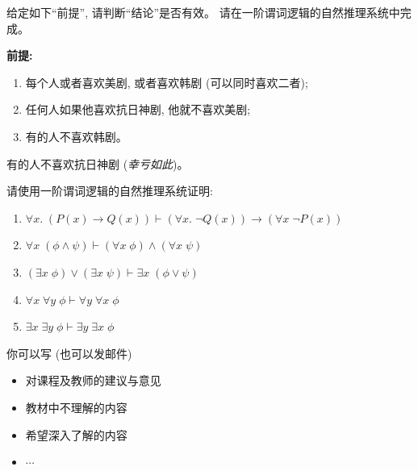 \documentclass[a4paper, justified]{tufte-handout}
\begin{document}
\begin{solution}
\end{solution}

\begin{problem}
  给定如下``前提'', 请判断``结论''是否有效。
  请在一阶谓词逻辑的自然推理系统中完成。

  {\bf 前提:}
  \begin{enumerate}[(1)]
    \item 每个人或者喜欢美剧, 或者喜欢韩剧 (可以同时喜欢二者);
    \item 任何人如果他喜欢抗日神剧, 他就不喜欢美剧;
    \item 有的人不喜欢韩剧。
  \end{enumerate}

  \vspace{0.20cm}
   有的人不喜欢抗日神剧 ({\it 幸亏如此})。
\end{problem}

\begin{solution}
\end{solution}

\begin{problem}
  请使用一阶谓词逻辑的自然推理系统证明:
  \begin{enumerate}[(1)]
    \item $\forall x.\; (P(x) \to Q(x)) \vdash
      (\forall x.\; \lnot Q(x)) \to (\forall x\; \lnot P(x))$
    \item $\forall x\; (\phi \land \psi) \vdash
      (\forall x\; \phi) \land (\forall x\; \psi)$
    \item $(\exists x\; \phi) \lor (\exists x\; \psi) \vdash
      \exists x\; (\phi \lor \psi)$
    \item $\forall x\; \forall y\; \phi \vdash \forall y\; \forall x\; \phi$
    \item $\exists x\; \exists y\; \phi \vdash
      \exists y\; \exists x\; \phi$
  \end{enumerate}
\end{problem}

\begin{solution}
\end{solution}


\begincorrection

\beginfb

你可以写 (也可以发邮件)
\begin{itemize}
  \item 对课程及教师的建议与意见
  \item 教材中不理解的内容
  \item 希望深入了解的内容
  \item $\cdots$
\end{itemize}
\end{document}
